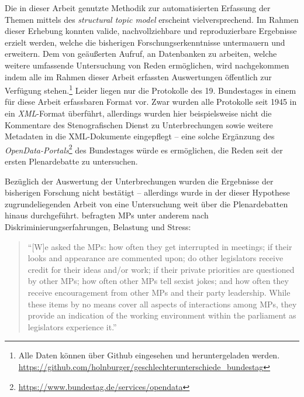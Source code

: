 \documentclass[12pt, 
    twoside=false, 
    bibliography=totoc, 
    numbers=endperiod, 
    headings=normal, 
    toc=chapterentrydotfill
    ]{scrbook}
\begin{document}
Die in dieser Arbeit genutzte Methodik zur automatisierten Erfassung der Themen mittels des \emph{structural topic model} erscheint vielversprechend. Im Rahmen dieser Erhebung konnten valide, nachvollziehbare und reproduzierbare Ergebnisse erzielt werden, welche die bisherigen Forschungserkenntnisse untermauern und erweitern. Dem von \textcite[18]{back_2018} geäußerten Aufruf, an Datenbanken zu arbeiten, welche weitere umfassende Untersuchung von Reden ermöglichen, wird nachgekommen indem alle im Rahmen dieser Arbeit erfassten Auswertungen öffentlich zur Verfügung stehen.\footnote{Alle Daten können über Github eingesehen und heruntergeladen werden. \url{https://github.com/holnburger/geschlechterunterschiede_bundestag}} Leider liegen nur die Protokolle des 19. Bundestages in einem für diese Arbeit erfassbaren Format vor. Zwar wurden alle Protokolle seit 1945 in ein \emph{XML}-Format überführt, allerdings wurden hier beispielsweise nicht die Kommentare des Stenografischen Dienst zu Unterbrechungen sowie weitere Metadaten in die XML-Dokumente eingepflegt -- eine solche Ergänzung des \emph{OpenData-Portals}\footnote{\url{https://www.bundestag.de/services/opendata}} des Bundestages würde es ermöglichen, die Reden seit der ersten Plenardebatte zu untersuchen.

Bezüglich der Auswertung der Unterbrechungen wurden die Ergebnisse der bisherigen Forschung nicht bestätigt -- allerdings wurde in der dieser Hypothese zugrundeliegenden Arbeit von \textcite{erikson_2018} eine Untersuchung weit über die Plenardebatten hinaus durchgeführt. \citeauthor{erikson_2018} befragten MPs unter anderem nach Diskriminierungserfahrungen, Belastung und Stress:

\begin{quote}
    \enquote{[W]e asked the MPs: how often they get interrupted in meetings; if their looks and appearance are commented upon; do other legislators receive credit for their ideas and/or work; if their private priorities are questioned by other MPs; how often other MPs tell sexist jokes; and how often they receive encouragement from other MPs and their party leadership. While these items by no means cover all aspects of interactions among MPs, they provide an indication of the working environment within the parliament as legislators experience it.} \parencite[205]{erikson_2018}
\end{quote}
\end{document}
